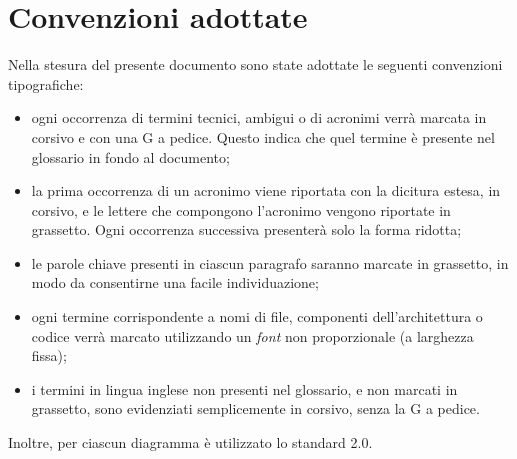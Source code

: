 \section{Convenzioni adottate}
Nella stesura del presente documento sono state adottate le seguenti convenzioni tipografiche:
\begin{itemize}
\item ogni occorrenza di termini tecnici, ambigui o di acronimi verrà marcata in corsivo e con una G a pedice. Questo indica che quel termine è presente nel glossario in fondo al documento;
\item la prima occorrenza di un acronimo viene riportata con la dicitura estesa, in corsivo, e le lettere che compongono l'acronimo vengono riportate in grassetto. Ogni occorrenza successiva presenterà solo la forma ridotta;
\item le parole chiave presenti in ciascun paragrafo saranno marcate in grassetto, in modo da consentirne una facile individuazione;
\item ogni termine corrispondente a nomi di file, componenti dell'architettura o codice verrà marcato utilizzando un \textit{font} non proporzionale (a larghezza fissa);
\item i termini in lingua inglese non presenti nel glossario, e non marcati in grassetto, sono evidenziati semplicemente in corsivo, senza la G a pedice.
\end{itemize}
Inoltre, per ciascun diagramma  è utilizzato lo standard 2.0. 